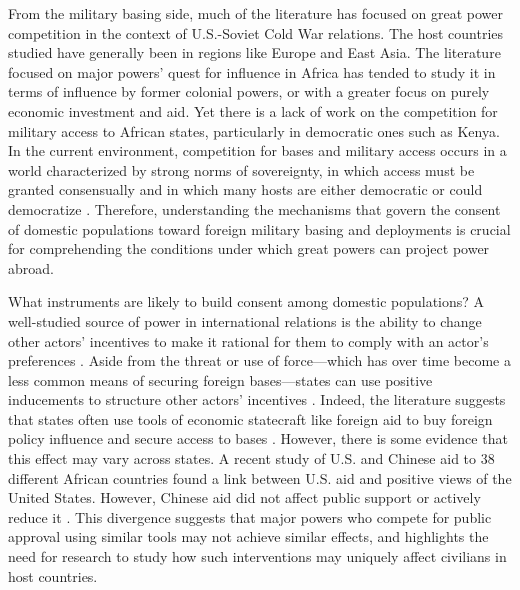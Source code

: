 From the military basing side, much of the literature has focused on great power competition in the context of U.S.-Soviet Cold War relations. The host countries studied have generally been in regions like Europe and East Asia. The literature focused on major powers' quest for influence in Africa has tended to study it in terms of influence by former colonial powers, or with a greater focus on purely economic investment and aid. Yet there is a lack of work on the competition for military access to African states, particularly in democratic ones such as Kenya. In the current environment, competition for bases and military access occurs in a world characterized by strong norms of sovereignty, in which access must be granted consensually and in which many hosts are either democratic or could democratize \cite{Cooley2008,schmidt2020}. Therefore, understanding the mechanisms that govern the consent of domestic populations toward foreign military basing and deployments is crucial for comprehending the conditions under which great powers can project power abroad. 

What instruments are likely to build consent among domestic populations? A well-studied source of power in international relations is the ability to change other actors' incentives to make it rational for them to comply with an actor's preferences \cite{dahl1961}. Aside from the threat or use of force—which has over time become a less common means of securing foreign bases—states can use positive inducements to structure other actors' incentives \cite{schmidt2020,Lake1996}. Indeed, the literature suggests that states often use tools of economic statecraft like foreign aid to buy foreign policy influence and secure access to bases \cite{carter2015,alexander2019,blankenship2020,joyce2023}. However, there is some evidence that this effect may vary across states. A recent study of U.S. and Chinese aid to 38 different African countries found a link between U.S. aid and positive views of the United States. However, Chinese aid did not affect public support or actively reduce it \cite{blair2022}. This divergence suggests that major powers who compete for public approval using similar tools may not achieve similar effects, and highlights the need for research to study how such interventions may uniquely affect civilians in host countries.

